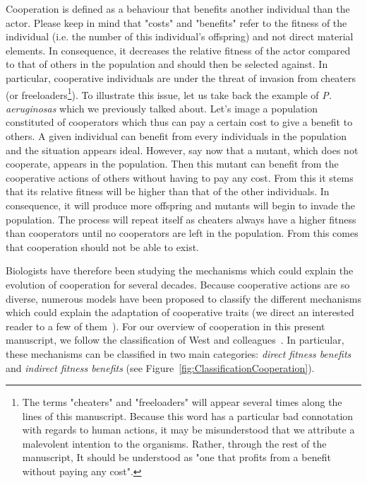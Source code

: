     Cooperation is defined as a behaviour that benefits another individual than the actor. Please keep in mind that "costs" and "benefits" refer to the fitness of the individual (i.e. the number of this individual's offspring) and not direct material elements. In consequence, it decreases the relative fitness of the actor compared to that of others in the population and should then be selected against. In particular, cooperative individuals are under the threat of invasion from cheaters (or freeloaders\footnote{The terms "cheaters" and "freeloaders" will appear several times along the lines of this manuscript. Because this word has a particular bad connotation with regards to human actions, it may be misunderstood that we attribute a malevolent intention to the organisms. Rather, through the rest of the manuscript, It should be understood as "one that profits from a benefit without paying any cost".}). To illustrate this issue, let us take back the example of \emph{P. aeruginosas} which we previously talked about. Let's image a population constituted of cooperators which thus can pay a certain cost to give a benefit to others. A given individual can benefit from every individuals in the population and the situation appears ideal. However, say now that a mutant, which does not cooperate, appears in the population. Then this mutant can benefit from the cooperative actions of others without having to pay any cost. From this it stems that its relative fitness will be higher than that of the other individuals. In consequence, it will produce more offspring and mutants will begin to invade the population. The process will repeat itself as cheaters always have a higher fitness than cooperators until no cooperators are left in the population. From this comes that cooperation should not be able to exist. 

    Biologists have therefore been studying the mechanisms which could explain the evolution of cooperation for several decades. Because cooperative actions are so diverse, numerous models have been proposed to classify the different mechanisms which could explain the adaptation of cooperative traits (we direct an interested reader to a few of them~\parencite{Dugatkin2002, Keller2006, Bergmuller2007a, West2007}). For our overview of cooperation in this present manuscript, we follow the classification of West and colleagues~\parencite{West2007a}. In particular, these mechanisms can be classified in two main categories: \emph{direct fitness benefits} and \emph{indirect fitness benefits} (see Figure~\ref{fig:ClassificationCooperation}).

